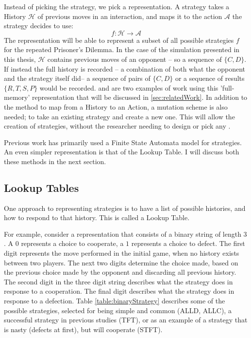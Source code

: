 \documentclass[a4paper,11pt,bcshonoursthesis,singlespace,oneside,thesisdraft,pdflatex]{cssethesis}
\begin{document}
Instead of picking the strategy, we pick a representation. 
A strategy takes a History $\mathcal{H}$ of previous moves in an interaction, and maps it to the action $\mathcal{A}$ the strategy decides to use:
\begin{equation}
f: \mathcal{H} \rightarrow \mathcal{A}
\end{equation}
The representation will be able to represent a subset of all possible strategies $f$ for the repeated Prisoner's Dilemma. 
In the case of the simulation presented in this thesis, $\mathcal{H}$ contains previous moves of an opponent -- so a sequence of $\{C,D\}$. 
If instead the full history is recorded -- a combination of both what the opponent and the strategy itself did-- a sequence of pairs of $\{C,D\}$ or a sequence of results $\{R,T,S,P\}$ would be recorded. \citet{axelrod1987evolution} and \citet{fogel1993evolving} are two examples of work using this 'full-memory' representation that will be discussed in \ref{sec:relatedWork}.
In addition to the method to map from a History to an Action, a mutation scheme is also needed; to take an existing strategy and create a new one. 
This will allow the creation of strategies, without the researcher needing to design or pick any \citep{koza}. 

Previous work has primarily used a Finite State Automata model for strategies. 
An even simpler representation is that of the Lookup Table. 
I will discuss both these methods in the next section. 
\subsection{Lookup Tables}
\label{sec:mutation}
One approach to representing strategies is to have a list of possible histories, and how to respond to that history. This is called a Lookup Table. 

For example, consider a representation that consists of a binary string of length 3 \citep{garcia:PLoSOne:2012}. A $0$ represents a choice to cooperate, a $1$ represents a choice to defect. 
The first digit represents the move performed in the initial game, when no history exists between two players. 
The next two digits determine the choice made, based on the previous choice made by the opponent and discarding all previous history. 
The second digit in the three digit string describes what the strategy does in response to a cooperation. 
The final digit describes what the strategy does in response to a defection. 
Table \ref{table:binaryStrategy} describes some of the possible strategies, selected for being simple and common (ALLD, ALLC), a successful strategy in previous studies (TFT), or as an example of a strategy that is nasty (defects at first), but will cooperate (STFT).
\end{document}
